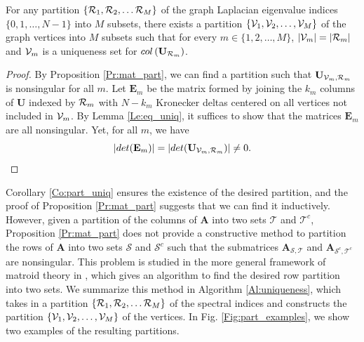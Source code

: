\documentclass[journal, 10pt]{IEEEtran}
\begin{document}
\begin{corollary}\label{Co:part_uniq}
For any %
partition $\{{\cal R}_1,{\cal R}_2,\ldots {\cal R}_M \}$ of the graph Laplacian eigenvalue indices $\{0,1,\ldots,N-1\}$ into $M$ subsets, there exists a partition $\{{\mathcal{V}}_1,{\mathcal{V}}_2,\ldots,{\mathcal{V}}_M\}$ of the graph vertices into $M$ subsets 
such that for every $m \in \{1,2,\ldots,M\}$, $|\V_m|=|{\cal R}_m|$ and 
${\mathcal{V}}_m$ is a uniqueness set for $\mbox{col}\left(\mathbf{U}_{{\cal R}_m}\right)$.%
\end{corollary}
\begin{proof}
By Proposition \ref{Pr:mat_part}, we can find a partition such that $\mathbf{U}_{\V_m,{\cal R}_m}$ is nonsingular for all $m$. Let $\mathbf{E}_m$ be the matrix formed by joining the $k_m$ columns of  $\mathbf{U}$ indexed by ${\cal R}_m$ with $N-k_m$ Kronecker deltas centered on all vertices not included in ${\mathcal{V}}_m$. By Lemma \ref{Le:eq_uniq}, it suffices to show that the matrices $\mathbf{E}_m$ are all nonsingular. Yet, for all $m$, we have
$$|\mbox{det}(\mathbf{E}_m)|=|\mbox{det}(\mathbf{U}_{\V_m,{\cal R}_m})| \neq 0.$$
\end{proof}

Corollary \ref{Co:part_uniq} ensures the existence of the desired partition, and the proof of Proposition \ref{Pr:mat_part} suggests that we can find it inductively. However, given a partition of the columns of ${\mathbf{A}}$ into two sets $\mathcal{T}$ and $\mathcal{T}^c$, Proposition \ref{Pr:mat_part} does not provide a constructive method to partition the rows of ${\mathbf{A}}$ into two sets $\mathcal{S}$ and $\mathcal{S}^c$ such that the submatrices ${\mathbf{A}}_{{\mathcal{S}},{\mathcal{T}}}$ and ${\mathbf{A}}_{{\mathcal{S}^c},{\mathcal{T}}^c}$ are nonsingular. This problem is studied in the more general framework of matroid theory in \cite{greene_magnanti}, which gives an algorithm to find the desired row partition into two sets. We summarize this method in Algorithm \ref{Al:uniqueness}, which takes in a partition $\{{\cal R}_1,{\cal R}_2,\ldots {\cal R}_M \}$ of the spectral indices and constructs the partition $\{{\mathcal{V}}_1,{\mathcal{V}}_2,\ldots,{\mathcal{V}}_M\}$ of the vertices. In Fig. \ref{Fig:part_examples}, we show two examples of the resulting partitions.
\end{document}
